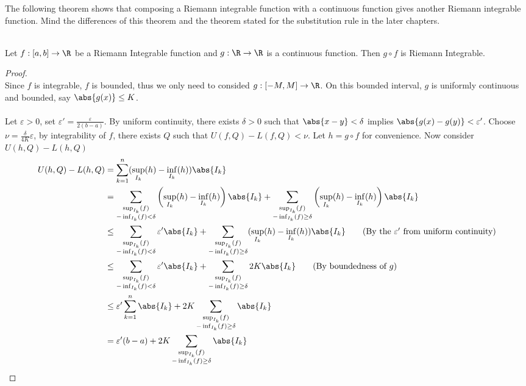 \documentclass[a4paper]{article}
\begin{document}
The following theorem shows that composing a Riemann integrable function with a continuous function gives another Riemann integrable function. Mind the differences of this theorem and the theorem stated for the substitution rule in the later chapters. 

\begin{thm}{}{}\\ Let $f:[a,b]\to\R$ be a Riemann Integrable function and $g:\R\to\R$ is a continuous function. Then $g\circ f$ is Riemann Integrable. 
\begin{proof}\\ Since $f$ is integrable, $f$ is bounded, thus we only need to consided $g:[-M,M]\to\R$. On this bounded interval, $g$ is uniformly continuous and bounded, say $\abs{g(x)}\leq K$. \\~\\
Let $\varepsilon>0$, set $\varepsilon'=\frac{\varepsilon}{2(b-a)}$. By uniform continuity, there exists $\delta>0$ such that $\abs{x-y}<\delta$ implies $\abs{g(x)-g(y)}<\varepsilon'$. Choose $\nu=\frac{\delta}{4K}\varepsilon$, by integrability of $f$, there exists $Q$ such that $U(f,Q)-L(f,Q)<\nu$. Let $h=g\circ f$ for convenience. Now consider $U(h,Q)-L(h,Q)$
\begin{align*}
U(h,Q)-L(h,Q)&=\sum_{k=1}^n(\sup_{I_k}(h)-\inf_{I_k}(h))\abs{I_k}\\
&=\sum_{\substack{\sup_{I_k}(f)\\-\inf_{I_k}(f)<\delta}}\left(\sup_{I_k}(h)-\inf_{I_k}(h)\right)\abs{I_k}+\sum_{\substack{\sup_{I_k}(f)\\-\inf_{I_k}(f)\geq\delta}}\left(\sup_{I_k}(h)-\inf_{I_k}(h)\right)\abs{I_k}\\
&\leq\sum_{\substack{\sup_{I_k}(f)\\-\inf_{I_k}(f)<\delta}}\varepsilon'\abs{I_k}+\sum_{\substack{\sup_{I_k}(f)\\-\inf_{I_k}(f)\geq\delta}}(\sup_{I_k}(h)-\inf_{I_k}(h))\abs{I_k}\tag{By the $\varepsilon'$ from uniform continuity}\\
&\leq\sum_{\substack{\sup_{I_k}(f)\\-\inf_{I_k}(f)<\delta}}\varepsilon'\abs{I_k}+\sum_{\substack{\sup_{I_k}(f)\\-\inf_{I_k}(f)\geq\delta}}2K\abs{I_k}\tag{By boundedness of $g$}\\
&\leq\varepsilon'\sum_{k=1}^n\abs{I_k}+2K\sum_{\substack{\sup_{I_k}(f)\\-\inf_{I_k}(f)\geq\delta}}\abs{I_k}\\
&=\varepsilon'(b-a)+2K\sum_{\substack{\sup_{I_k}(f)\\-\inf_{I_k}(f)\geq\delta}}\abs{I_k}

\end{align*}
\end{proof}
\end{thm}
\end{document}
